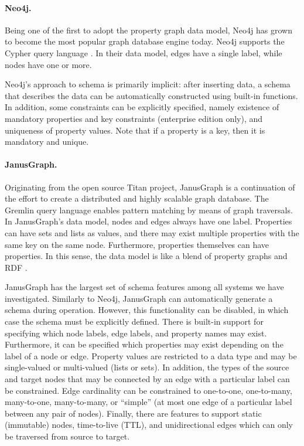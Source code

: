 \documentclass{report}
\theoremstyle{definition}
\begin{document}
\paragraph{Neo4j.} Being one of the first to adopt the property graph data model, Neo4j has grown to become the most popular graph database engine today. Neo4j supports the Cypher query language \citep{francis2018cypher}. In their data model, edges have a single label, while nodes have one or more.

Neo4j's approach to schema is primarily implicit: after inserting data, a schema that describes the data can be automatically constructed using built-in functions. In addition, some constraints can be explicitly specified, namely existence of mandatory properties and key constraints (enterprise edition only), and uniqueness of property values. Note that if a property is a key, then it is mandatory and unique.

\paragraph{JanusGraph.} Originating from the open source Titan project, JanusGraph is a continuation of the effort to create a distributed and highly scalable graph database. The Gremlin query language \citep{rodriguez2015gremlin} enables pattern matching by means of graph traversals. In JanusGraph's data model, nodes and edges always have one label. Properties can have sets and lists as values, and there may exist multiple properties with the same key on the same node. Furthermore, properties themselves can have properties. In this sense, the data model is like a blend of property graphs and RDF \citep{pan2009rdf}.

JanusGraph has the largest set of schema features among all systems we have investigated. Similarly to Neo4j, JanusGraph can automatically generate a schema during operation. However, this functionality can be disabled, in which case the schema must be explicitly defined. There is built-in support for specifying which node labels, edge labels, and property names may exist. Furthermore, it can be specified which properties may exist depending on the label of a node or edge. Property values are restricted to a data type and may be single-valued or multi-valued (lists or sets). In addition, the types of the source and target nodes that may be connected by an edge with a particular label can be constrained. Edge cardinality can be constrained to one-to-one, one-to-many, many-to-one, many-to-many, or ``simple'' (at most one edge of a particular label between any pair of nodes). Finally, there are features to support static (immutable) nodes, time-to-live (TTL), and unidirectional edges which can only be traversed from source to target.
\end{document}
